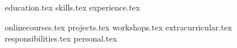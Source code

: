 \documentclass[11pt, a4paper]{awesome-cv}
\newcommand*{\sectiondir}{resume/}
\begin{document}
\makecvheader

{education.tex}
{skills.tex}
{experience.tex}
\pagebreak

{onlinecourses.tex}
{projects.tex}
{workshops.tex}
{extracurricular.tex}
{responsibilities.tex}
{personal.tex}
\end{document}
